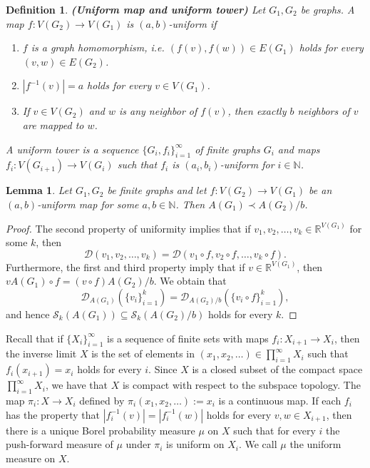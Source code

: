 \documentclass[a4wider]{amsart}
\newtheorem{definition}[theorem]{Definition}
\newtheorem{lemma}[theorem]{Lemma}
\theoremstyle{definitionbreak}\newtheorem{D}[theorem]{Definition}
\theoremstyle{definitionbreak}\newtheorem*{D*}{Definition}
\begin{document}
\begin{definition}{\bf (Uniform map and uniform tower)} Let $G_1,G_2$ be graphs. A map $f:V(G_2)\to V(G_1)$ is $(a,b)$-uniform if 
\begin{enumerate}
\item $f$ is a graph homomorphism, i.e. $(f(v),f(w))\in E(G_1)$ holds for every $(v,w)\in E(G_2)$.  
\item $|f^{-1}(v)|=a$ holds for every $v\in V(G_1)$.
\item If $v\in V(G_2)$ and $w$ is any neighbor of $f(v)$, then exactly $b$ neighbors of $v$ are mapped to $w$.
\end{enumerate}
A uniform tower is a sequence $\{G_i,f_i\}_{i=1}^\infty$ of finite graphs $G_i$ and maps $f_i:V(G_{i+1})\to V(G_i)$ such that $f_i$ is $(a_i,b_i)$-uniform for $i\in\mathbb{N}$.
\end{definition}

\begin{lemma}\label{hyplem1} Let $G_1,G_2$ be finite graphs and let $f:V(G_2)\to V(G_1)$ be an $(a,b)$-uniform map for some $a,b\in\mathbb{N}$. Then $A(G_1)\prec A(G_2)/b$.
\end{lemma}

\begin{proof} The second property of uniformity implies that if $v_1,v_2,\dots,v_k\in \mathbb{R}^{V(G_1)}$ for some $k$, then $$\mathcal{D}(v_1,v_2,\dots,v_k)=\mathcal{D}(v_1\circ f,v_2\circ f,\dots,v_k\circ f).$$
Furthermore, the first and third property imply that if $v\in\mathbb{R}^{V(G_1)}$, then $vA(G_1)\circ f=(v\circ f)A(G_2)/b$. We obtain that 
$$\mathcal{D}_{A(G_1)}(\{v_i\}_{i=1}^k)=\mathcal{D}_{A(G_2)/b}(\{v_i\circ f\}_{i=1}^k),$$ and hence $\mathcal{S}_k(A(G_1))\subseteq\mathcal{S}_k(A(G_2)/b)$ holds for every $k$.
\end{proof}

Recall that if $\{X_i\}_{i=1}^\infty$ is a sequence of finite sets with maps $f_i:X_{i+1}\to X_i$, then the inverse limit $X$ is the set of elements in $(x_1,x_2,\dots)\in \prod_{i=1}^\infty X_i$ such that $f_i(x_{i+1})=x_i$ holds for every $i$. Since $X$ is a closed subset of the compact space $\prod_{i=1}^\infty X_i$, we have that $X$ is compact with respect to the subspace topology. The map $\pi_i: X\to X_i$ defined by $\pi_i(x_1,x_2,\dots):=x_i$ is a continuous map. If each $f_i$ has the property that $|f_i^{-1}(v)|=|f_i^{-1}(w)|$ holds for every $v,w\in X_{i+1}$, then there is a unique Borel probability measure $\mu$ on $X$ such that for every $i$ the push-forward measure of $\mu$ under $\pi_i$ is uniform on $X_i$. We call $\mu$ the uniform measure on $X$.
\end{document}
